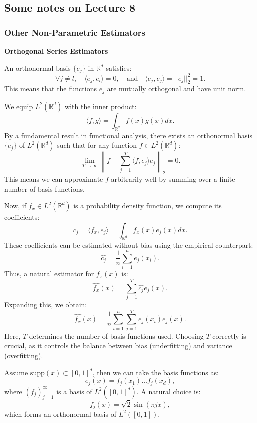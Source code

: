 \documentclass{article}
\begin{document}
\subsection{Some notes on Lecture 8}

\subsubsection{Other Non-Parametric Estimators}

\textbf{Orthogonal Series Estimators}

An orthonormal basis \(\{e_j\}\) in \(\mathbb{R}^d\) satisfies:
\[
\forall j \neq l, \quad \langle e_j, e_l \rangle = 0, \quad \text{and} \quad \langle e_j, e_j \rangle = ||e_j||^2_2 = 1.
\]
This means that the functions \(e_j\) are mutually orthogonal and have unit norm.

We equip \( L^2(\mathbb{R}^d) \) with the inner product:
\[
\langle f, g \rangle = \int_{\mathbb{R}^d} f(x) g(x) dx.
\]
By a fundamental result in functional analysis, there exists an orthonormal basis \( \{e_j\} \) of \( L^2(\mathbb{R}^d) \) such that for any function \( f \in L^2(\mathbb{R}^d) \):
\[
\lim_{T \to \infty} \left\| f - \sum_{j=1}^{T} \langle f, e_j \rangle e_j \right\|_2 = 0.
\]
This means we can approximate \( f \) arbitrarily well by summing over a finite number of basis functions.

Now, if \( f_x \in L^2(\mathbb{R}^d) \) is a probability density function, we compute its coefficients:
\[
c_j = \langle f_x, e_j \rangle = \int_{\mathbb{R}^d} f_x(x) e_j(x) dx.
\]
These coefficients can be estimated without bias using the empirical counterpart:
\[
\hat{c_j} = \frac{1}{n} \sum_{i=1}^{n} e_j(x_i).
\]
Thus, a natural estimator for \( f_x(x) \) is:
\[
\hat{f_x}(x) = \sum_{j=1}^{T} \hat{c_j} e_j(x).
\]
Expanding this, we obtain:
\[
\hat{f_x}(x) = \frac{1}{n} \sum_{i=1}^{n} \sum_{j=1}^{T} e_j(x_i) e_j(x).
\]
Here, \( T \) determines the number of basis functions used. Choosing \( T \) correctly is crucial, as it controls the balance between bias (underfitting) and variance (overfitting).

\begin{example}
    Assume \( \text{supp}(x) \subset [0,1]^d \), then we can take the basis functions as:
    \[
    e_j(x) = f_j(x_1) \dots f_j(x_d),
    \]
    where \( (f_j)_{j=1}^{\infty} \) is a basis of \( L^2([0,1]^d) \). A natural choice is:
    \[
    f_j(x) = \sqrt{2} \sin (\pi j x),
    \]
    which forms an orthonormal basis of \( L^2([0,1]) \).
\end{example}
\end{document}

